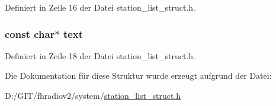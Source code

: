 Definiert in Zeile 16 der Datei station\+\_\+list\+\_\+struct.\+h.

\hypertarget{structstation__list_a16343090e80c4472521560f30113d96c}{}
\subsubsection[{text}]{\setlength{\rightskip}{0pt plus 5cm}const char$\ast$ text}\label{structstation__list_a16343090e80c4472521560f30113d96c}


Definiert in Zeile 18 der Datei station\+\_\+list\+\_\+struct.\+h.



Die Dokumentation für diese Struktur wurde erzeugt aufgrund der Datei\+:\begin{DoxyCompactItemize}
\item 
D\+:/\+G\+I\+T/fhradiov2/system/\hyperlink{station__list__struct_8h}{station\+\_\+list\+\_\+struct.\+h}\end{DoxyCompactItemize}
